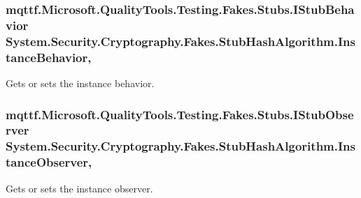 \hypertarget{class_system_1_1_security_1_1_cryptography_1_1_fakes_1_1_stub_hash_algorithm_a0f09e7ae8feb4fd7329f508b00222b47}{
\subsubsection[{Instance\-Behavior}]{\setlength{\rightskip}{0pt plus 5cm}mqttf.\-Microsoft.\-Quality\-Tools.\-Testing.\-Fakes.\-Stubs.\-I\-Stub\-Behavior System.\-Security.\-Cryptography.\-Fakes.\-Stub\-Hash\-Algorithm.\-Instance\-Behavior\hspace{0.3cm}{\ttfamily [get]}, {\ttfamily [set]}}}\label{class_system_1_1_security_1_1_cryptography_1_1_fakes_1_1_stub_hash_algorithm_a0f09e7ae8feb4fd7329f508b00222b47}


Gets or sets the instance behavior.

\hypertarget{class_system_1_1_security_1_1_cryptography_1_1_fakes_1_1_stub_hash_algorithm_a0873fb0c75120d84a9b4d196f9a3dfc0}{
\subsubsection[{Instance\-Observer}]{\setlength{\rightskip}{0pt plus 5cm}mqttf.\-Microsoft.\-Quality\-Tools.\-Testing.\-Fakes.\-Stubs.\-I\-Stub\-Observer System.\-Security.\-Cryptography.\-Fakes.\-Stub\-Hash\-Algorithm.\-Instance\-Observer\hspace{0.3cm}{\ttfamily [get]}, {\ttfamily [set]}}}\label{class_system_1_1_security_1_1_cryptography_1_1_fakes_1_1_stub_hash_algorithm_a0873fb0c75120d84a9b4d196f9a3dfc0}


Gets or sets the instance observer.

